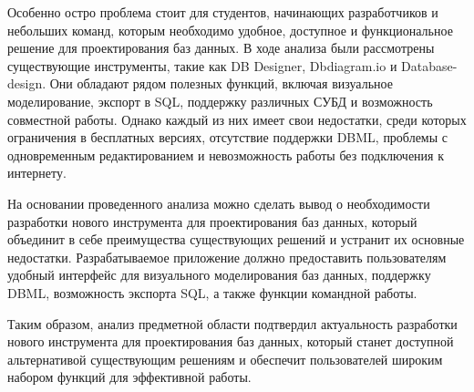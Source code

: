 Особенно остро проблема стоит для студентов, начинающих разработчиков и небольших команд, которым необходимо удобное, доступное и функциональное решение для проектирования баз данных. В ходе анализа были рассмотрены существующие инструменты, такие как DB Designer, Dbdiagram.io и Database-design. Они обладают рядом полезных функций, включая визуальное моделирование, экспорт в SQL, поддержку различных СУБД и возможность совместной работы. Однако каждый из них имеет свои недостатки, среди которых ограничения в бесплатных версиях, отсутствие поддержки DBML, проблемы с одновременным редактированием и невозможность работы без подключения к интернету.

На основании проведенного анализа можно сделать вывод о необходимости разработки нового инструмента для проектирования баз данных, который объединит в себе преимущества существующих решений и устранит их основные недостатки. Разрабатываемое приложение должно предоставить пользователям удобный интерфейс для визуального моделирования баз данных, поддержку DBML, возможность экспорта SQL, а также функции командной работы.

Таким образом, анализ предметной области подтвердил актуальность разработки нового инструмента для проектирования баз данных, который станет доступной альтернативой существующим решениям и обеспечит пользователей широким набором функций для эффективной работы.